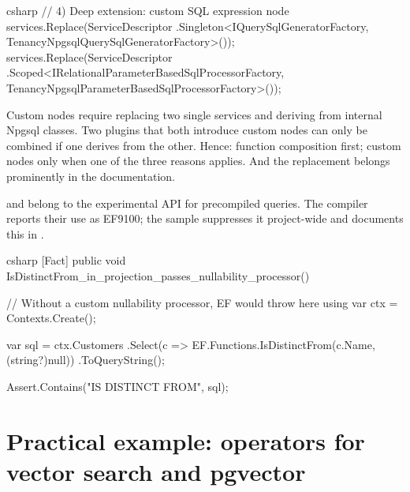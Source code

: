 \begin{sourcecode}{csharp}
// 4) Deep extension: custom SQL expression node
services.Replace(ServiceDescriptor
    .Singleton<IQuerySqlGeneratorFactory, TenancyNpgsqlQuerySqlGeneratorFactory>());
services.Replace(ServiceDescriptor
    .Scoped<IRelationalParameterBasedSqlProcessorFactory,
        TenancyNpgsqlParameterBasedSqlProcessorFactory>());
\end{sourcecode}

\begin{important}
  Custom nodes require replacing two single services and deriving from internal Npgsql
  classes. Two plugins that both introduce custom nodes can only be combined if one derives
  from the other. Hence: function composition first; custom nodes only when one of the three
  reasons applies. And the replacement belongs prominently in the documentation.
\end{important}

\begin{note}
   and
   belong
  to the experimental API for precompiled queries. The compiler reports their use as EF9100;
  the sample suppresses it project-wide and documents this in
  .
\end{note}

\begin{sourcecode}{csharp}
[Fact]
public void IsDistinctFrom_in_projection_passes_nullability_processor()
{
    // Without a custom nullability processor, EF would throw here
    using var ctx = Contexts.Create();

    var sql = ctx.Customers
        .Select(c => EF.Functions.IsDistinctFrom(c.Name, (string?)null))
        .ToQueryString();

    Assert.Contains("IS DISTINCT FROM", sql);
}
\end{sourcecode}

\section{Practical example: operators for vector search and pgvector}

